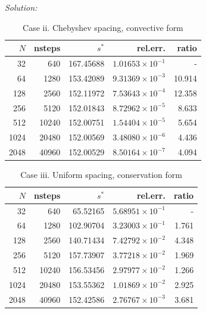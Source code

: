 \documentclass[11pt]{article}
\newenvironment{solution}
    {\textit{Solution:}}
    {}
\begin{document}
\begin{solution}
\begin{table}[H]
\centering
\caption{Case ii. Chebyshev spacing, convective form}
\begin{tabular}{@{}rrrrr@{}}
\toprule
$N$ & nsteps & $s^*$ & rel.err. & ratio \\
\midrule
  32 &   640 & 167.45688 & $1.01653 \times 10^{-1}$ & - \\
  64 &  1280 & 153.42089 & $9.31369 \times 10^{-3}$ & 10.914 \\
 128 &  2560 & 152.11972 & $7.53643 \times 10^{-4}$ & 12.358 \\
 256 &  5120 & 152.01843 & $8.72962 \times 10^{-5}$ & 8.633 \\
 512 & 10240 & 152.00751 & $1.54404 \times 10^{-5}$ & 5.654 \\
1024 & 20480 & 152.00569 & $3.48080 \times 10^{-6}$ & 4.436 \\
2048 & 40960 & 152.00529 & $8.50164 \times 10^{-7}$ & 4.094 \\
\bottomrule
\end{tabular}
\end{table}

\begin{table}[H]
\centering
\caption{Case iii. Uniform spacing, conservation form}
\begin{tabular}{@{}rrrrr@{}}
\toprule
$N$ & nsteps & $s^*$ & rel.err. & ratio \\
\midrule
  32 &   640 &  65.52165 & $5.68951 \times 10^{-1}$ & - \\
  64 &  1280 & 102.90704 & $3.23003 \times 10^{-1}$ & 1.761 \\
 128 &  2560 & 140.71434 & $7.42792 \times 10^{-2}$ & 4.348 \\
 256 &  5120 & 157.73907 & $3.77218 \times 10^{-2}$ & 1.969 \\
 512 & 10240 & 156.53456 & $2.97977 \times 10^{-2}$ & 1.266 \\
1024 & 20480 & 153.55362 & $1.01869 \times 10^{-2}$ & 2.925 \\
2048 & 40960 & 152.42586 & $2.76767 \times 10^{-3}$ & 3.681 \\
\bottomrule
\end{tabular}
\end{table}


\end{solution}
\end{document}
